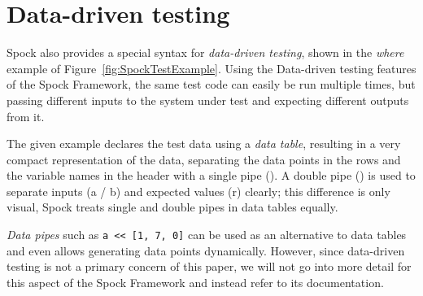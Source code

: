 \section{Data-driven testing}
Spock also provides a special syntax for \textit{data-driven testing},
shown in the \textit{where} example of Figure~\ref{fig:SpockTestExample}.
Using the Data-driven testing features of the Spock Framework,
the same test code can easily be run multiple times,
but passing different inputs to the system under test
and expecting different outputs from it.
\autocite[Chapter: Data Driven Testing]{SpockFrameworkDoc}

The given example declares the test data using a \textit{data table},
resulting in a very compact representation of the data,
separating the data points in the rows
and the variable names in the header
with a single pipe (\code{|}).
A double pipe (\code{||}) is used to separate
inputs (a / b) and expected values (r) clearly;
this difference is only visual,
Spock treats single and double pipes in data tables equally.
\autocite[Chapter: Data Driven Testing - Syntactic Variations]{SpockFrameworkDoc}

\textit{Data pipes} such as \texttt{a << [1, 7, 0]}
can be used as an alternative to data tables and even
allows generating data points dynamically.
However, since data-driven testing is not a primary concern of this paper,
we will not go into more detail for this aspect of the Spock Framework
and instead refer to its documentation.
\autocite{SpockFrameworkDoc}
